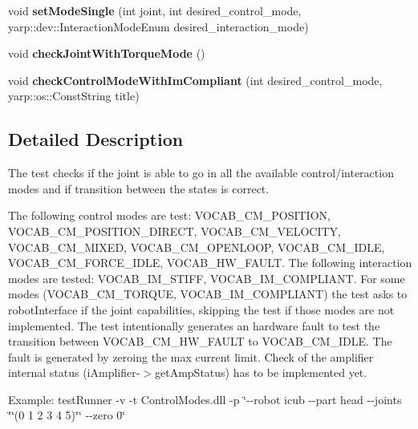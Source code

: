\begin{DoxyCompactItemize}
\item 
void {\bfseries set\-Mode\-Single} (int joint, int desired\-\_\-control\-\_\-mode, yarp\-::dev\-::\-Interaction\-Mode\-Enum desired\-\_\-interaction\-\_\-mode)\label{classControlModes_af9a2fe5d8cdeba9c6a4c6419b7e10c26}

\item 
void {\bfseries check\-Joint\-With\-Torque\-Mode} ()\label{classControlModes_a5a886c22a344441ff40d7223b1a9b7aa}

\item 
void {\bfseries check\-Control\-Mode\-With\-Im\-Compliant} (int desired\-\_\-control\-\_\-mode, yarp\-::os\-::\-Const\-String title)\label{classControlModes_ae0706d70e86af67fbff3d01e58e6cb86}

\end{DoxyCompactItemize}


\subsection{Detailed Description}
The test checks if the joint is able to go in all the available control/interaction modes and if transition between the states is correct. 

The following control modes are test\-: V\-O\-C\-A\-B\-\_\-\-C\-M\-\_\-\-P\-O\-S\-I\-T\-I\-O\-N, V\-O\-C\-A\-B\-\_\-\-C\-M\-\_\-\-P\-O\-S\-I\-T\-I\-O\-N\-\_\-\-D\-I\-R\-E\-C\-T, V\-O\-C\-A\-B\-\_\-\-C\-M\-\_\-\-V\-E\-L\-O\-C\-I\-T\-Y, V\-O\-C\-A\-B\-\_\-\-C\-M\-\_\-\-M\-I\-X\-E\-D, V\-O\-C\-A\-B\-\_\-\-C\-M\-\_\-\-O\-P\-E\-N\-L\-O\-O\-P, V\-O\-C\-A\-B\-\_\-\-C\-M\-\_\-\-I\-D\-L\-E, V\-O\-C\-A\-B\-\_\-\-C\-M\-\_\-\-F\-O\-R\-C\-E\-\_\-\-I\-D\-L\-E, V\-O\-C\-A\-B\-\_\-\-H\-W\-\_\-\-F\-A\-U\-L\-T. The following interaction modes are tested\-: V\-O\-C\-A\-B\-\_\-\-I\-M\-\_\-\-S\-T\-I\-F\-F, V\-O\-C\-A\-B\-\_\-\-I\-M\-\_\-\-C\-O\-M\-P\-L\-I\-A\-N\-T. For some modes (V\-O\-C\-A\-B\-\_\-\-C\-M\-\_\-\-T\-O\-R\-Q\-U\-E, V\-O\-C\-A\-B\-\_\-\-I\-M\-\_\-\-C\-O\-M\-P\-L\-I\-A\-N\-T) the test asks to robot\-Interface if the joint capabilities, skipping the test if those modes are not implemented. The test intentionally generates an hardware fault to test the transition between V\-O\-C\-A\-B\-\_\-\-C\-M\-\_\-\-H\-W\-\_\-\-F\-A\-U\-L\-T to V\-O\-C\-A\-B\-\_\-\-C\-M\-\_\-\-I\-D\-L\-E. The fault is generated by zeroing the max current limit. Check of the amplifier internal status (i\-Amplifier-\/$>$get\-Amp\-Status) has to be implemented yet.

Example\-: test\-Runner -\/v -\/t Control\-Modes.\-dll -\/p \char`\"{}-\/-\/robot icub -\/-\/part head -\/-\/joints \char`\"{}\char`\"{}(0 1 2 3 4 5)\char`\"{}\char`\"{} -\/-\/zero 0\char`\"{}

